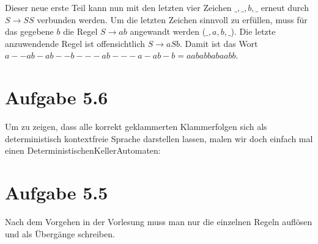 \documentclass{article}
\newcommand{\rpt}{%
        \raisebox{.2ex}{:}%
        \raisebox{-.4ex}{\rule{.1ex}{2.5ex}\,\rule{.2ex}{2.5ex}}}
\newcommand{\revrpt}{%
        \raisebox{-.2ex}{\rule{.2ex}{2.5ex}\,\rule{.1ex}{2.5ex}}%
        \raisebox{.2ex}{:}}
\begin{document}
Dieser neue erste Teil kann nun mit den letzten vier Zeichen $\_,\_,b,\_$ erneut durch $S \rightarrow SS$ verbunden werden. Um die letzten Zeichen sinnvoll zu erfüllen, muss für das gegebene $b$ die Regel $S \rightarrow ab$ angewandt werden ($\_,a,b,\_$). Die letzte anzuwendende Regel ist offensichtlich $S \rightarrow aSb$. Damit ist das Wort \linebreak $a--ab-ab--b---ab---a-ab-b = aababbabaabb$.



\section*{Aufgabe 5.6}
Um zu zeigen, dass alle korrekt geklammerten Klammerfolgen sich als deterministisch kontextfreie Sprache darstellen lassen, malen wir doch einfach mal einen DeterministischenKellerAutomaten:

\begin{center}
\end{center}



\section*{Aufgabe 5.5}
Nach dem Vorgehen in der Vorlesung muss man nur die einzelnen Regeln auflösen und als Übergänge schreiben.
\begin{center}
\end{center}
\end{document}
